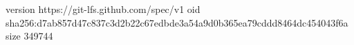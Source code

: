 version https://git-lfs.github.com/spec/v1
oid sha256:d7ab857d47c837c3d2b22c67edbde3a54a9d0b365ea79cddd8464dc454043f6a
size 349744
